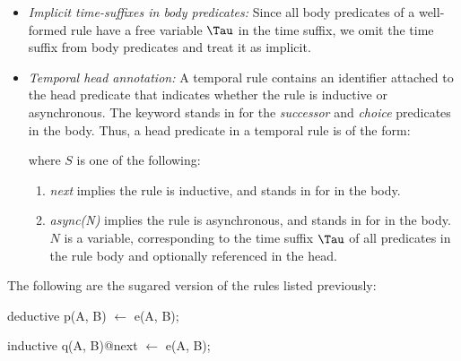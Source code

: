\begin{itemize}
%
%
\item {\em Implicit time-suffixes in body predicates:} Since all body
predicates of a well-formed rule have a free variable $\Tau$ in the time
suffix, we omit the time suffix from body predicates and treat it as implicit.
%
\item {\em Temporal head annotation:} A temporal rule contains an identifier
attached to the head predicate that indicates whether the rule is inductive or
asynchronous.  The keyword stands in for the {\em successor} and {\em choice}
predicates in the body.  Thus, a head predicate in a temporal rule is of the 
form:


where $S$ is one of the following:
%
\begin{enumerate}
%
\item \emph{next} implies the rule is inductive, and stands in for
\linebreak{} in the body.
%
\item \emph{async(N)} implies the rule is asynchronous, and stands in for
 in the body.  $N$ is a variable,
corresponding to the time suffix $\Tau$ of all predicates in the rule body and
optionally referenced in the head.  
%
\end{enumerate}
%
\end{itemize}


\begin{example}

The following are the sugared version of the rules listed previously:

\begin{Dedalus}
deductive
p(A, B) \(\leftarrow\)
  e(A, B);
  
inductive 
q(A, B)@next \(\leftarrow\)
  e(A, B);
  
    
\end{Dedalus}


\end{example}


